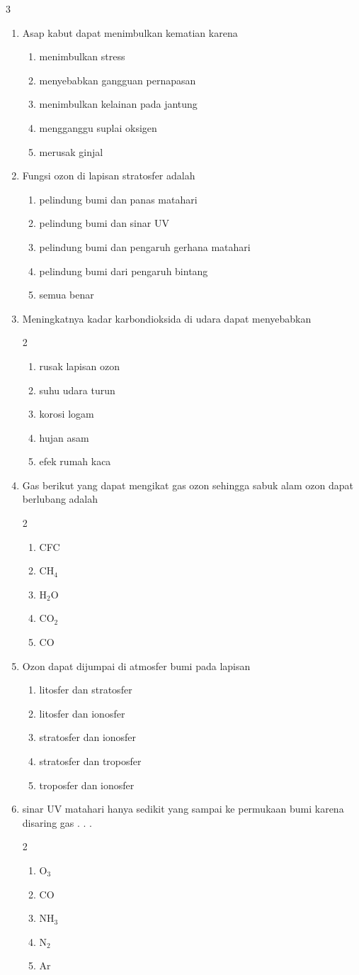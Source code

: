 \documentclass[10pt,a4paper]{extarticle}
\newcommand*\pilgan[1]{
\begin{enumerate}[label=\Alph*., itemsep=0pt,topsep=0pt,leftmargin=*,align=Center] #1 
\end{enumerate}}
\newcommand{\pilgani}[1]{                            \vspace{-0.3cm}\begin{multicols}{2}
 \begin{enumerate}[label=\Alph*., itemsep=0pt,topsep=0pt,leftmargin=*,align=Center]#1                     \end{enumerate}
 \phantom{ini cuma sapi, wedus, dan ayam}
 \end{multicols}}
\begin{document}
\begin{multicols*}{3}
\begin{enumerate}
\item Asap kabut dapat menimbulkan kematian karena
\pilgan{
   \item menimbulkan stress
   \item menyebabkan gangguan pernapasan
   \item menimbulkan kelainan pada jantung
   \item mengganggu suplai oksigen
   \item merusak ginjal}

\item Fungsi ozon di lapisan stratosfer adalah
\pilgan{
   \item pelindung bumi dan panas matahari
   \item pelindung bumi dan sinar UV
   \item pelindung bumi dan pengaruh gerhana matahari
   \item pelindung bumi dari pengaruh bintang
   \item semua benar }

\item Meningkatnya kadar karbondioksida di udara dapat menyebabkan 
\pilgani{
   \item rusak lapisan ozon
   \item suhu udara turun
   \item korosi logam
   \item hujan asam
   \item efek rumah kaca}

\item Gas berikut yang dapat mengikat gas ozon sehingga sabuk alam ozon dapat berlubang adalah
\pilgani{
   \item CFC
   \item CH$_4$
   \item H$_2$O
   \item CO$_2$
   \item CO }

\item Ozon dapat dijumpai di atmosfer bumi pada lapisan 
\pilgan{
   \item litosfer dan stratosfer
   \item litosfer dan ionosfer
   \item stratosfer dan ionosfer
   \item stratosfer dan troposfer
   \item troposfer dan ionosfer
}

\item sinar UV matahari hanya sedikit yang sampai ke permukaan bumi karena disaring gas . . .
\pilgani{
   \item O$_3$
   \item CO
   \item NH$_3$
   \item N$_2$
   \item Ar }


\end{enumerate}
\end{multicols*}
\end{document}
